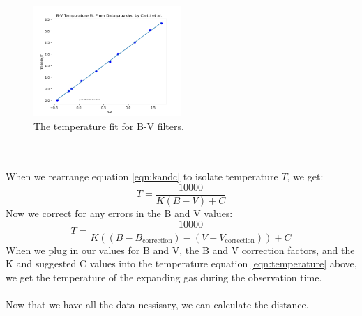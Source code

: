 \begin{figure} [h!]
    \begin{center}
    \includegraphics[width=0.5\textwidth]{B-V_Temperature_fit.png}
    \end{center}
    \label{fig:bv_temp}
    \caption{The temperature fit for B-V filters.}    
\end{figure}
\\
\\
When we rearrange equation \ref{eqn:kandc} to isolate temperature $T$, we get:
\begin{equation}
    T = \frac{10000}{K(B-V)+C}
\end{equation}
Now we correct for any errors in the B and V values:
\begin{equation}\label{eqn:temperature}
    T = \frac{10000}{K((B-B_\textrm{correction})-(V-V_\textrm{correction}))+C}
\end{equation}
When we plug in our values for B and V, the B and V correction factors, and the K 
and suggested C values into the temperature equation \ref{eqn:temperature} 
above, we get the temperature of the expanding gas during the observation time.
\\
\\
Now that we have all the data nessisary, we can calculate the distance.
